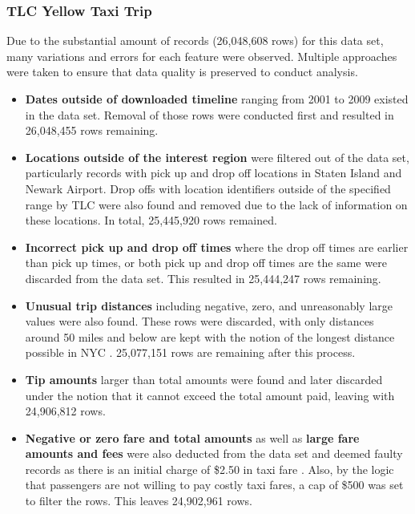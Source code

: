 \documentclass[11pt]{article}
\begin{document}
\subsubsection{TLC Yellow Taxi Trip}
Due to the substantial amount of records (26,048,608 rows) for this data set, many variations and errors for each feature were observed. Multiple approaches were taken to ensure that data quality is preserved to conduct analysis.
\begin{itemize}
    \item \textbf{Dates outside of downloaded timeline} ranging from 2001 to 2009 existed in the data set. Removal of those rows were conducted first and resulted in 26,048,455 rows remaining.
    
    \item \textbf{Locations outside of the interest region} were filtered out of the data set, particularly records with pick up and drop off locations in Staten Island and Newark Airport. Drop offs with location identifiers outside of the specified range by TLC were also found and removed due to the lack of information on these locations. In total, 25,445,920 rows remained.

    \item \textbf{Incorrect pick up and drop off times} where the drop off times are earlier than pick up times, or both pick up and drop off times are the same were discarded from the data set. This resulted in 25,444,247 rows remaining.
    
    \item \textbf{Unusual trip distances} including negative, zero, and unreasonably large values were also found. These rows were discarded, with only distances around 50 miles and below are kept with the notion of the longest distance possible in NYC \cite{NYCDistance}. 25,077,151 rows are remaining after this process.
    
    \item \textbf{Tip amounts} larger than total amounts were found and later discarded under the notion that it cannot exceed the total amount paid, leaving with 24,906,812 rows.

    \item \textbf{Negative or zero fare and total amounts} as well as \textbf{large fare amounts and fees} were also deducted from the data set and deemed faulty records as there is an initial charge of \$2.50 in taxi fare \cite{TLCTaxiFare}. Also, by the logic that passengers are not willing to pay costly taxi fares, a cap of \$500 was set to filter the rows. This leaves 24,902,961 rows.


\end{itemize}
\end{document}
